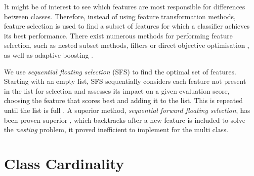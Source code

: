 It might be of interest to see which features are most responsible for differences between classes. Therefore, instead of using feature transformation methods, feature selection is used to find a subset of features for which a classifier achieves its best performance. There exist numerous methods for performing feature selection, such as nested subset methods, filters or direct objective optimisation \cite{Guyon}, as well as adaptive boosting \cite{Wang_2}.

We use \textit{sequential floating selection} (SFS) \cite{Somol} to find the optimal set of features. Starting with an empty list, SFS sequentially considers each feature not present in the list for selection and assesses its impact on a given evaluation score, choosing the feature that scores best and adding it to the list. This is repeated until the list is full \cite{Juha}. A superior method, \textit{sequential forward floating selection}, has been proven superior \cite{Somol}, which backtracks after a new feature is included to solve the \textit{nesting} problem, it proved inefficient to implement for the multi class.


\section{Class Cardinality}